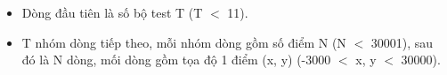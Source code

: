 \begin{itemize}
	\item     Dòng đầu tiên là số bộ test T (T $<$ 11).   
	\item     T nhóm dòng tiếp theo, mỗi nhóm dòng gồm số điểm N (N $<$ 30001), sau đó là N dòng, mối dòng gồm tọa độ 1 điểm (x, y) (-3000 $<$ x, y $<$ 30000).   
\end{itemize}

\